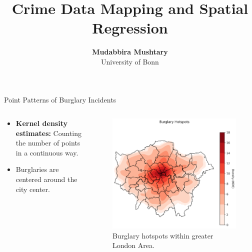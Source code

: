 \documentclass[10pt, aspectratio=169]{beamer}
\begin{document}
\title{Crime Data Mapping and Spatial Regression}

\author[Mudabbira Mushtary]
{
{\bf Mudabbira Mushtary}\\
{\small University of Bonn}\\[1ex]
}


\begin{frame}
    \titlepage
    \note{~}
\end{frame}

\begin{frame}{Point Patterns of Burglary Incidents}
    \begin{columns}
        \begin{column}{0.5\textwidth}
            \begin{itemize}
                \item \textbf{Kernel density estimates:} Counting the number of points in a continuous way.
                \item Burglaries are centered around the city center.
            \end{itemize}
        \end{column}
        \begin{column}{0.5\textwidth}
            \begin{figure}
            \centering
                \includegraphics[width=1.0\textwidth]{burglary_hotspots.png}
                \caption{Burglary hotspots within greater London Area.}
            \end{figure}
        \end{column}
    \end{columns}
\end{frame}
\end{document}
